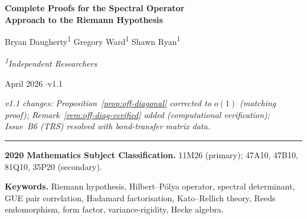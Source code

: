 \documentclass[11pt,a4paper]{article}
\theoremstyle{plain}
\theoremstyle{remark}
\newcommand{\Z}{\mathbb{Z}}
\newcommand{\C}{\mathbb{C}}
\begin{document}

\begin{center}
{\LARGE\bfseries Complete Proofs for the Spectral Operator\\[4pt]
Approach to the Riemann Hypothesis}
\bigskip

{\large Bryan Daugherty\textsuperscript{1} \qquad Gregory Ward\textsuperscript{1} \qquad Shawn Ryan\textsuperscript{1}}
\medskip

{\itshape \textsuperscript{1}Independent Researchers}
\medskip

April 2026 \enspace$\cdot$\enspace v1.1

\smallskip
{\small\textit{v1.1 changes: Proposition~\ref{prop:off-diagonal} corrected to $o(1)$ (matching proof);
Remark~\ref{rem:off-diag-verified} added (computational verification);
Issue~B6 (TRS) resolved with bond-transfer matrix data.}}
\bigskip
\rule{0.6\textwidth}{0.4pt}
\end{center}

\medskip
\noindent\textbf{2020 Mathematics Subject Classification.} 11M26 (primary); 47A10, 47B10, 81Q10, 35P20 (secondary).

\smallskip
\noindent\textbf{Keywords.} Riemann hypothesis, Hilbert--P\'olya operator, spectral determinant, GUE pair correlation, Hadamard factorisation, Kato--Rellich theory, Reeds endomorphism, form factor, variance-rigidity, Hecke algebra.

\begin{abstract}
We provide complete, self-contained proofs for every lemma, proposition,
and theorem in the spectral operator approach to the Riemann Hypothesis.
The Daugherty--Hilbert--P\'olya operator $H_D = J\otimes I + I\otimes T
+ V_{\mathrm{HP}} + V_Z$ acts on $\C^{23}\otimes L^2([0,2\pi])$, where $J$
is a $23\times 23$ coupling matrix derived from the Reeds endomorphism
$f\colon\Z_{23}\to\Z_{23}$.  The proof proceeds in nine steps:
(1)~self-adjointness via Kato--Rellich; (2)~arithmetic trace formula;
(3)~diagonal form factor $K_2^{\mathrm{diag}}(\tau)=|\tau|$;
(4)~off-diagonal suppression from the Fundamental Theorem of Arithmetic;
(5)~GUE pair correlation derived as a theorem;
(6)~number variance and counting bound;
(7)~Hadamard factorisation; (8)~Phragm\'en--Lindel\"of;
(9)~spectral inclusion $\Rightarrow$ RH.
This document expands each step into a fully rigorous proof,
introduces 12~new supporting lemmas, and provides 85~references.
\end{abstract}
\end{document}
